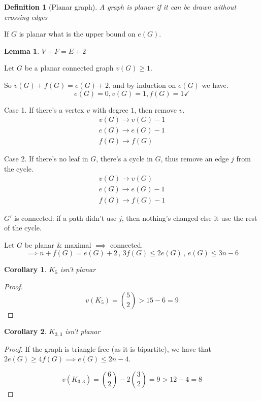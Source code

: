 \documentclass[english, dark, index]{Iart}
\newtheorem{corollary}{Corollary}[theorem]
\newtheorem{lemma}{Lemma}[theorem]
\newtheorem{definition}{Definition}[part]
\begin{document}
	\begin{definition}[Planar graph]
		A graph is planar if it can be drawn without crossing edges
	\end{definition}

	If $ G $ is planar what is the upper bound on $ e(G) $.
	
	\begin{lemma}
		$ V+F=E+2 $
	\end{lemma}

	Let $ G $ be a planar connected graph $ v(G)\geqslant 1 $.
	
	So $ v(G)+f(G)=e(G)+2 $, and by induction on $ e(G) $ we have.
	\[ e(G)=0,v(G)=1,f(G)=1\checkmark \]
	
	Case 1. If there's a vertex $ v $ with degree $ 1 $, then remove $ v $.
	\begin{gather*}
		v(G)\to v(G)-1\\
		e(G)\to e(G)-1\\
		f(G)\to f(G)
	\end{gather*}

	Case 2. If there's no leaf in $ G $, there's a cycle in $ G $, thus remove an edge $ j $ from the cycle.
	\begin{gather*}
		v(G)\to v(G)\\
		e(G)\to e(G)-1\\
		f(G)\to f(G)-1
	\end{gather*}

	$ G' $ is connected: if a path didn't use $ j $, then nothing's changed else it use the rest of the cycle.
	
	Let $ G $ be planar \& maximal $ \implies $ connected.
	\[ \implies n+f(G)=e(G)+2\,,\,3f(G)\leqslant 2e(G)\,,\,e(G)\leqslant 3n-6 \]
	
	\begin{corollary}
		$ K_5 $ isn't planar
	\end{corollary}

	\begin{proof}
		\[ v(K_5)=\binom{5}{2}>15-6=9 \]
	\end{proof}

	\begin{corollary}
		$ K_{3,3} $ isn't planar
	\end{corollary}
	
	\begin{proof}
		If the graph is triangle free (as it is bipartite), we have that $ 2e(G)\geqslant 4f(G)\implies e(G)\leqslant 2n-4 $.
		
		\[ v(K_{3,3})=\binom{6}{2}-2\binom{3}{2}=9>12-4=8 \]
	\end{proof}
\end{document}
